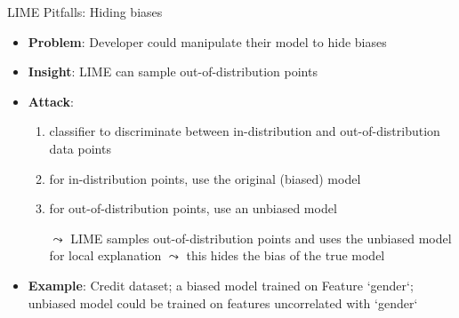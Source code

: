 \documentclass[11pt,compress,t,notes=noshow, aspectratio=169, xcolor=table]{beamer}
\begin{document}
\begin{vbframe}{LIME Pitfalls: Hiding biases }

\begin{itemize}
	\item \textbf{Problem}: Developer could manipulate their model to hide biases 
	\item \textbf{Insight}: LIME can sample out-of-distribution points
	\item \textbf{Attack}:
	\begin{enumerate}
	    \item classifier to discriminate between in-distribution and out-of-distribution data points
	    \item for in-distribution points, use the original (biased) model
	    \item for out-of-distribution points, use an unbiased model 
	    \item[$\leadsto$] LIME samples out-of-distribution points and uses the unbiased model for local explanation $\leadsto$ this hides the bias of the true model
	\end{enumerate}
	\item \textbf{Example}: Credit dataset; a biased model trained on Feature `gender`; unbiased model could be trained on features uncorrelated with `gender`
\end{itemize}
\end{vbframe}
\end{document}
